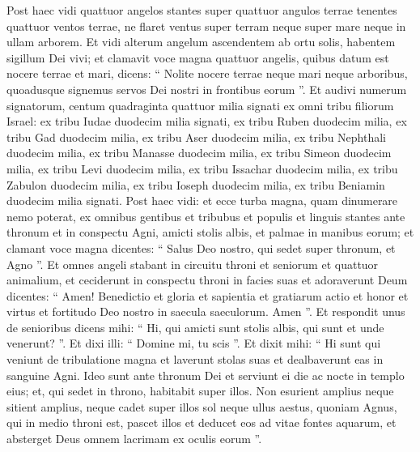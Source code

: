 \begin{biblechapter}
\begin{biblechapter}
\begin{biblechapter}
\begin{biblechapter}
\begin{biblechapter}
\begin{biblechapter}
\begin{biblechapter}
\verse Post haec vidi quattuor angelos stantes super quattuor angulos terrae tenentes quattuor ventos terrae, ne flaret ventus super terram neque super mare neque in ullam arborem. 
\verse Et vidi alterum angelum ascendentem ab ortu solis, habentem sigillum Dei vivi; et clamavit voce magna quattuor angelis, quibus datum est nocere terrae et mari, 
\verse dicens: “ Nolite nocere terrae neque mari neque arboribus, quoadusque signemus servos Dei nostri in frontibus eorum ”. 
 \verse Et audivi numerum signatorum, centum quadraginta quattuor milia signati ex omni tribu filiorum Israel: 
\verse ex tribu Iudae duodecim milia signati, ex tribu Ruben duodecim milia, ex tribu Gad duodecim milia, 
\verse ex tribu Aser duodecim milia, ex tribu Nephthali duodecim milia, ex tribu Manasse duodecim milia, 
\verse ex tribu Simeon duodecim milia, ex tribu Levi duodecim milia, ex tribu Issachar duodecim milia, 
\verse ex tribu Zabulon duodecim milia, ex tribu Ioseph duodecim milia, ex tribu Beniamin duodecim milia signati.
 \verse Post haec vidi: et ecce turba magna, quam dinumerare nemo poterat, ex omnibus gentibus et tribubus et populis et linguis stantes ante thronum et in conspectu Agni, amicti stolis albis, et palmae in manibus eorum; 
\verse et clamant voce magna dicentes: “ Salus Deo nostro, qui sedet super thronum, et Agno ”.
 \verse Et omnes angeli stabant in circuitu throni et seniorum et quattuor animalium, et ceciderunt in conspectu throni in facies suas et adoraverunt Deum 
\verse dicentes:
 “ Amen! Benedictio et gloria et sapientia et gratiarum actio et honor et virtus et fortitudo Deo nostro in saecula saeculorum. Amen ”.
 \verse Et respondit unus de senioribus dicens mihi: “ Hi, qui amicti sunt stolis albis, qui sunt et unde venerunt? ”. 
\verse Et dixi illi: “ Domine mi, tu scis ”. Et dixit mihi: “ Hi sunt qui veniunt de tribulatione magna et laverunt stolas suas et dealbaverunt eas in sanguine Agni. 
\verse Ideo sunt ante thronum Dei et serviunt ei die ac nocte in templo eius; et, qui sedet in throno, habitabit super illos. 
\verse Non esurient amplius neque sitient amplius, neque cadet super illos sol neque ullus aestus, 
\verse quoniam Agnus, qui in medio throni est, pascet illos et deducet eos ad vitae fontes aquarum, et absterget Deus omnem lacrimam ex oculis eorum ”.
 

\end{biblechapter}
\end{biblechapter}
\end{biblechapter}
\end{biblechapter}
\end{biblechapter}
\end{biblechapter}
\end{biblechapter}
